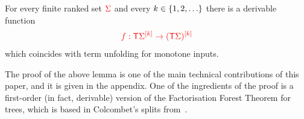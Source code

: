 \begin{proposition}\label{prop:monotone-unfold}
    For every finite ranked set $\rSigma$ and every $k \in \set{1,2,\ldots}$ there is a derivable function 
    \begin{align*}
    \ranked{ f : \tmonad \mati k \Sigma \to \mati k {(\tmonad \Sigma)}}
    \end{align*}
    which coincides with term unfolding for monotone inputs.
\end{proposition}
The proof of the  above lemma is one of the main technical contributions of this paper, and it is given in the appendix. One of the ingredients of the proof is a first-order (in fact, derivable) version of the Factorisation Forest Theorem for trees, which is based in Colcombet's splits from~\cite{colcombetCombinatorialTheoremTrees2007}.  

